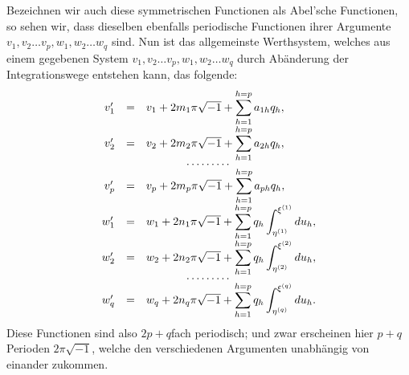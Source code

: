 \documentclass[10pt]{article}
\begin{document}
Bezeichnen wir auch diese symmetrischen Functionen als Abel'sche Functionen, so sehen wir, dass dieselben ebenfalls periodische Functionen ihrer Argumente \(v_1,v_2\ldots v_p,w_1,w_2\ldots w_q\) sind. Nun ist das allgemeinste Werthsystem, welches aus einem gegebenen System \(v_1,v_2\ldots v_p,w_1,w_2\ldots w_q\) durch Abänderung der Integrationswege entstehen kann, das folgende:
\[
\begin{array}{rcl}
v_1'&=&v_1+2m_1\pi\sqrt{-1}+\displaystyle\sum_{h=1}^{h=p}a_{1h}q_h,\\
v_2'&=&v_2+2m_2\pi\sqrt{-1}+\displaystyle\sum_{h=1}^{h=p}a_{2h}q_h,\\[-0.3em]
\multicolumn{3}{c}{\cdots\cdots\cdots}\\[-0.3em]
v_p'&=&v_p+2m_p\pi\sqrt{-1}+\displaystyle\sum_{h=1}^{h=p}a_{ph}q_h,\\
w_1'&=&w_1+2n_1\pi\sqrt{-1}+\displaystyle\sum_{h=1}^{h=p}q_h\int_{\eta^{(1)}}^{\xi^{(1)}}du_h,\\
w_2'&=&w_2+2n_2\pi\sqrt{-1}+\displaystyle\sum_{h=1}^{h=p}q_h\int_{\eta^{(2)}}^{\xi^{(2)}}du_h,\\[-0.3em]
\multicolumn{3}{c}{\cdots\cdots\cdots}\\[-0.3em]
w_q'&=&w_q+2n_q\pi\sqrt{-1}+\displaystyle\sum_{h=1}^{h=p}q_h\int_{\eta^{(q)}}^{\xi^{(q)}}du_h.
\end{array}
\]
Diese Functionen sind also \(2p+q\)fach periodisch; und zwar erscheinen hier \(p+q\) Perioden \(2\pi\sqrt{-1}\), welche den verschiedenen Argumenten unabhängig von einander zukommen.
\end{document}
